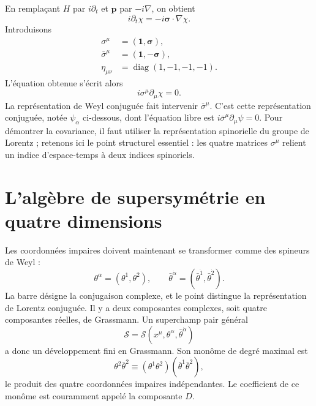 En remplaçant \(H\) par \(i\partial_t\) et \(\mathbf p\) par \(-i\nabla\), on obtient
\begin{equation}
i\partial_t\chi=-i\boldsymbol{\sigma}\cdot\nabla\chi.
\end{equation}
Introduisons
\begin{equation}
\begin{aligned}
\sigma^\mu&=(\mathbf 1,\boldsymbol{\sigma}),\\
\bar\sigma^\mu&=(\mathbf 1,-\boldsymbol{\sigma}),\\
\eta_{\mu\nu}&=\operatorname{diag}(1,-1,-1,-1).
\end{aligned}
\label{eq:l8-sigma-convention}
\end{equation}
L’équation obtenue s’écrit alors
\begin{equation}
i\sigma^\mu\partial_\mu\chi=0.
\label{eq:l8-weyl-equation}
\end{equation}
La représentation de Weyl conjuguée fait intervenir \(\bar\sigma^\mu\). C’est cette représentation conjuguée, notée \(\psi_\alpha\) ci-dessous, dont l’équation libre est \(i\bar\sigma^\mu\partial_\mu\psi=0\). Pour démontrer la covariance, il faut utiliser la représentation spinorielle du groupe de Lorentz ; retenons ici le point structurel essentiel : les quatre matrices \(\sigma^\mu\) relient un indice d’espace-temps à deux indices spinoriels.

\section{L’algèbre de supersymétrie en quatre dimensions}

Les coordonnées impaires doivent maintenant se transformer comme des spineurs de Weyl :
\begin{equation}
\theta^\alpha=(\theta^1,\theta^2),
\qquad
\bar\theta^{\dot\alpha}=(\bar\theta^{\dot1},\bar\theta^{\dot2}).
\end{equation}
La barre désigne la conjugaison complexe, et le point distingue la représentation de Lorentz conjuguée. Il y a deux composantes complexes, soit quatre composantes réelles, de Grassmann. Un superchamp pair général
\begin{equation}
\mathcal S=\mathcal S(x^\mu,\theta^\alpha,\bar\theta^{\dot\alpha})
\end{equation}
a donc un développement fini en Grassmann. Son monôme de degré maximal est
\begin{equation}
\theta^2\bar\theta^2
\equiv
(\theta^1\theta^2)(\bar\theta^{\dot1}\bar\theta^{\dot2}),
\end{equation}
le produit des quatre coordonnées impaires indépendantes. Le coefficient de ce monôme est couramment appelé la composante \(D\).

